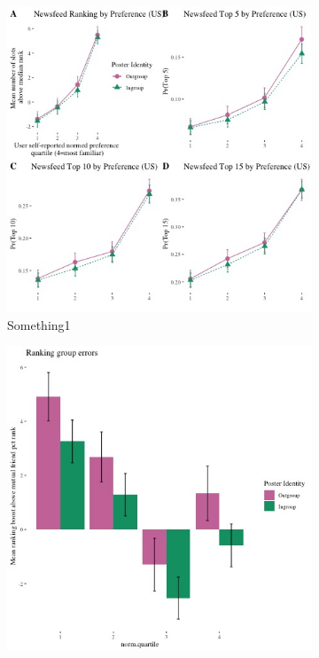 \documentclass[12pt,letterpaper]{article}
\begin{document}
\begin{figure}[ht]
\caption{PYMK Results}
\label{fig:pymk_main}
    \begin{subfigure}{.5\textwidth} 
        \centering
        \includegraphics[width=1\linewidth]{Output/Graphs/Audit/Ranking line graphs/US PYMK all outcomes panel by norm preference by ingroup.jpg} 
        \caption{Something1}
        \label{fig:pymk_line}
        \end{subfigure}
    \begin{subfigure}{.5\textwidth}
        \centering
        \includegraphics[width=1\linewidth]{Output/Graphs/Audit/Misranking relative to expectation/Mutual friends expectation/US PYMK by norm pref.jpg}  

\end{subfigure}
\end{figure}
\end{document}
